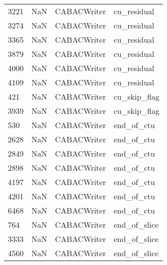 \begin{tabular}{llll}
3221 &                   NaN &                CABACWriter &                               cu\_residual \\
3274 &                   NaN &                CABACWriter &                               cu\_residual \\
3365 &                   NaN &                CABACWriter &                               cu\_residual \\
3879 &                   NaN &                CABACWriter &                               cu\_residual \\
4000 &                   NaN &                CABACWriter &                               cu\_residual \\
4109 &                   NaN &                CABACWriter &                               cu\_residual \\
421  &                   NaN &                CABACWriter &                              cu\_skip\_flag \\
3939 &                   NaN &                CABACWriter &                              cu\_skip\_flag \\
530  &                   NaN &                CABACWriter &                                end\_of\_ctu \\
2628 &                   NaN &                CABACWriter &                                end\_of\_ctu \\
2849 &                   NaN &                CABACWriter &                                end\_of\_ctu \\
2898 &                   NaN &                CABACWriter &                                end\_of\_ctu \\
4197 &                   NaN &                CABACWriter &                                end\_of\_ctu \\
4201 &                   NaN &                CABACWriter &                                end\_of\_ctu \\
6468 &                   NaN &                CABACWriter &                                end\_of\_ctu \\
764  &                   NaN &                CABACWriter &                              end\_of\_slice \\
3333 &                   NaN &                CABACWriter &                              end\_of\_slice \\
4560 &                   NaN &                CABACWriter &                              end\_of\_slice \\

\end{tabular}
